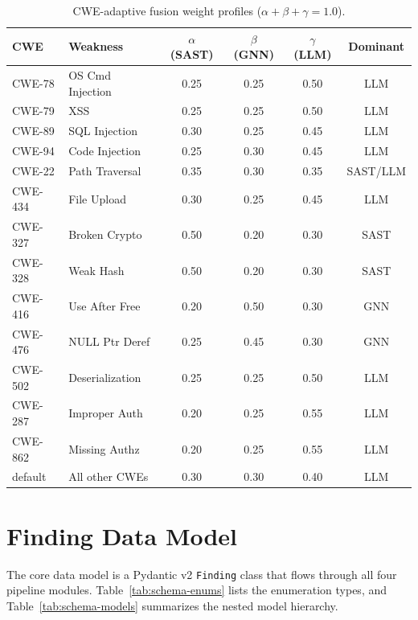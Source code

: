 \begin{table}[H]
\centering
{\small
\caption{CWE-adaptive fusion weight profiles ($\alpha + \beta + \gamma = 1.0$).}
\label{tab:fusion-weights}
\begin{tabular}{llcccc}
\toprule
\textbf{CWE} & \textbf{Weakness} & $\alpha$ \textbf{(SAST)} & $\beta$ \textbf{(GNN)} & $\gamma$ \textbf{(LLM)} & \textbf{Dominant} \\
\midrule
CWE-78  & OS Cmd Injection  & 0.25 & 0.25 & 0.50 & LLM \\
CWE-79  & XSS               & 0.25 & 0.25 & 0.50 & LLM \\
CWE-89  & SQL Injection      & 0.30 & 0.25 & 0.45 & LLM \\
CWE-94  & Code Injection     & 0.25 & 0.30 & 0.45 & LLM \\
CWE-22  & Path Traversal     & 0.35 & 0.30 & 0.35 & SAST/LLM \\
CWE-434 & File Upload        & 0.30 & 0.25 & 0.45 & LLM \\
CWE-327 & Broken Crypto      & 0.50 & 0.20 & 0.30 & SAST \\
CWE-328 & Weak Hash          & 0.50 & 0.20 & 0.30 & SAST \\
CWE-416 & Use After Free     & 0.20 & 0.50 & 0.30 & GNN \\
CWE-476 & NULL Ptr Deref     & 0.25 & 0.45 & 0.30 & GNN \\
CWE-502 & Deserialization    & 0.25 & 0.25 & 0.50 & LLM \\
CWE-287 & Improper Auth      & 0.20 & 0.25 & 0.55 & LLM \\
CWE-862 & Missing Authz      & 0.20 & 0.25 & 0.55 & LLM \\
\midrule
default & All other CWEs     & 0.30 & 0.30 & 0.40 & LLM \\
\bottomrule
\end{tabular}
}
\end{table}

\section{Finding Data Model}
\label{app:schema}

The core data model is a Pydantic v2 \texttt{Finding} class that flows through all four pipeline modules. Table~\ref{tab:schema-enums} lists the enumeration types, and Table~\ref{tab:schema-models} summarizes the nested model hierarchy.

